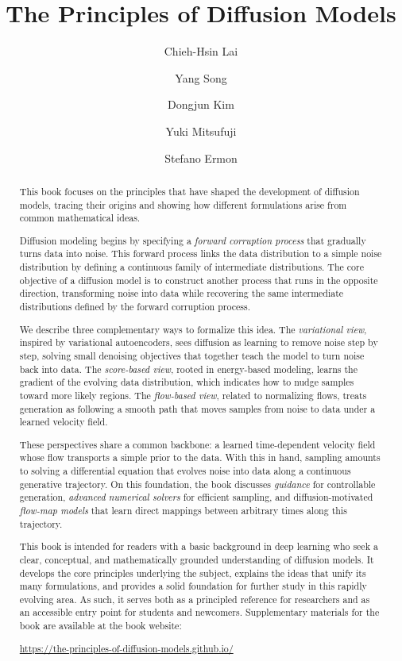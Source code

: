 \documentclass[examplefnt,biber]{nowfnt-arxiv} %
\title{The Principles of Diffusion Models}
\author[1]{Chieh-Hsin Lai}
\author[2]{Yang Song}
\author[3]{Dongjun Kim}
\author[4]{Yuki Mitsufuji}
\author[5]{Stefano Ermon}
\affil[1]{Sony AI; \url{chieh-hsin.lai@sony.com} / \url{chiehhsinlai@gmail.com}}
\affil[2]{OpenAI\footnote{Affiliation reflects the institution at the time of the work.}; \url{thusongyang@gmail.com}}
\affil[3]{Stanford University; \url{dongjun@stanford.edu}}
\affil[4]{Sony Group Corporation, Sony AI; \url{yuhki.mitsufuji@sony.com}}
\affil[5]{Stanford University; \url{ermon@cs.stanford.edu}}
\newtheorem[M]{question}{\sffamily\bfseries Question}[section]
\begin{document}
\makeabstracttitle

\begin{abstract}
This book focuses on the principles that have shaped the development of diffusion models, tracing their origins and showing how different formulations arise from common mathematical ideas.


Diffusion modeling begins by specifying a \emph{forward corruption process} that gradually turns data into noise. This forward process links the data distribution to a simple noise distribution by defining a continuous family of intermediate distributions. The core objective of a diffusion model is to construct another process that runs in the opposite direction, transforming noise into data while recovering the same intermediate distributions defined by the forward corruption process.

We describe three complementary ways to formalize this idea. The \emph{variational view}, inspired by variational autoencoders, sees diffusion as learning to remove noise step by step, solving small denoising objectives that together teach the model to turn noise back into data. The \emph{score-based view}, rooted in energy-based modeling, learns the gradient of the evolving data distribution, which indicates how to nudge samples toward more likely regions. The \emph{flow-based view}, related to normalizing flows, treats generation as following a smooth path that moves samples from noise to data under a learned velocity field.



These perspectives share a common backbone: a learned time-dependent velocity field whose flow transports a simple prior to the data. With this in hand, sampling amounts to solving a differential equation that evolves noise into data along a continuous generative trajectory. On this foundation, the book discusses \emph{guidance} for controllable generation, \emph{advanced numerical solvers} for efficient sampling, and diffusion-motivated \emph{flow-map models} that learn direct mappings between arbitrary times along this trajectory.

This book is intended for readers with a basic background in deep learning who seek a clear, conceptual, and mathematically grounded understanding of diffusion models. It develops the core principles underlying the subject, explains the ideas that unify its many formulations, and provides a solid foundation for further study in this rapidly evolving area. As such, it serves both as a principled reference for researchers and as an accessible entry point for students and newcomers. Supplementary materials for the book are available at the book website: 

{\centering
\url{https://the-principles-of-diffusion-models.github.io/}\par
}
\end{abstract}
\end{document}
